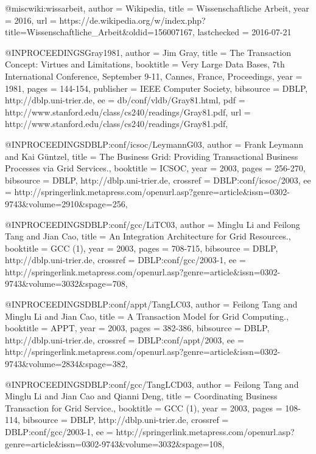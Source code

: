 @misc{wiki:wissarbeit,
  author = {Wikipedia},
  title = {Wissenschaftliche Arbeit},
  year = {2016},
  url = {https://de.wikipedia.org/w/index.php?title=Wissenschaftliche\_Arbeit&oldid=156007167},
  lastchecked = {2016-07-21}
}

@INPROCEEDINGS{Gray1981,
  author = {Jim Gray},
  title = {{The Transaction Concept: Virtues and Limitations}},
  booktitle = {Very Large Data Bases, 7th International Conference, September 9-11,
	Cannes, France, Proceedings},
  year = {1981},
  pages = {144-154},
  publisher = {IEEE Computer Society},
  bibsource = {DBLP, http://dblp.uni-trier.de},
  ee = {db/conf/vldb/Gray81.html},
  pdf = {http://www.stanford.edu/class/cs240/readings/Gray81.pdf},
  url = {http://www.stanford.edu/class/cs240/readings/Gray81.pdf},
}

@INPROCEEDINGS{DBLP:conf/icsoc/LeymannG03,
  author = {Frank Leymann and Kai Güntzel},
  title = {{The Business Grid: Providing Transactional Business Processes via
	Grid Services.}},
  booktitle = {ICSOC},
  year = {2003},
  pages = {256-270},
  bibsource = {DBLP, http://dblp.uni-trier.de},
  crossref = {DBLP:conf/icsoc/2003},
  ee = {http://springerlink.metapress.com/openurl.asp?genre=article{\&}issn=0302-9743{\&}volume=2910{\&}spage=256},
}

@INPROCEEDINGS{DBLP:conf/gcc/LiTC03,
  author = {Minglu Li and Feilong Tang and Jian Cao},
  title = {{An Integration Architecture for Grid Resources.}},
  booktitle = {GCC (1)},
  year = {2003},
  pages = {708-715},
  bibsource = {DBLP, http://dblp.uni-trier.de},
  crossref = {DBLP:conf/gcc/2003-1},
  ee = {http://springerlink.metapress.com/openurl.asp?genre=article{\&}issn=0302-9743{\&}volume=3032{\&}spage=708},
}

@INPROCEEDINGS{DBLP:conf/appt/TangLC03,
  author = {Feilong Tang and Minglu Li and Jian Cao},
  title = {{A Transaction Model for Grid Computing.}},
  booktitle = {APPT},
  year = {2003},
  pages = {382-386},
  bibsource = {DBLP, http://dblp.uni-trier.de},
  crossref = {DBLP:conf/appt/2003},
  ee = {http://springerlink.metapress.com/openurl.asp?genre=article{\&}issn=0302-9743{\&}volume=2834{\&}spage=382},
}

@INPROCEEDINGS{DBLP:conf/gcc/TangLCD03,
  author = {Feilong Tang and Minglu Li and Jian Cao and Qianni Deng},
  title = {{Coordinating Business Transaction for Grid Service.}},
  booktitle = {GCC (1)},
  year = {2003},
  pages = {108-114},
  bibsource = {DBLP, http://dblp.uni-trier.de},
  crossref = {DBLP:conf/gcc/2003-1},
  ee = {http://springerlink.metapress.com/openurl.asp?genre=article{\&}issn=0302-9743{\&}volume=3032{\&}spage=108},
}

